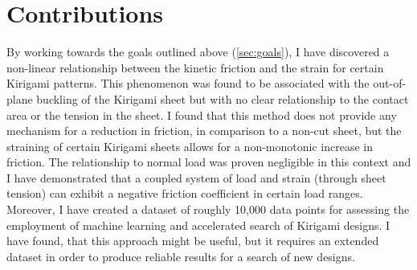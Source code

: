 






\section{Contributions}
By working towards the goals outlined above (\cref{sec:goals}), I have
discovered a non-linear relationship between the kinetic friction and the strain
for certain Kirigami patterns. This phenomenon was found to be associated with
the out-of-plane buckling of the Kirigami sheet but with no clear relationship
to the contact area or the tension in the sheet. I found that this method does
not provide any mechanism for a reduction in friction, in comparison to a
non-cut sheet, but the straining of certain Kirigami sheets allows for a
non-monotonic increase in friction. The relationship to normal load was proven
negligible in this context and I have demonstrated that a coupled system of load
and strain (through sheet tension) can exhibit a negative friction coefficient
in certain load ranges. Moreover, I have created a dataset of roughly 10,000
data points for assessing the employment of machine learning and accelerated
search of Kirigami designs. I have found, that this approach might be useful,
but it requires an extended dataset in order to produce reliable results for a
search of new designs.

